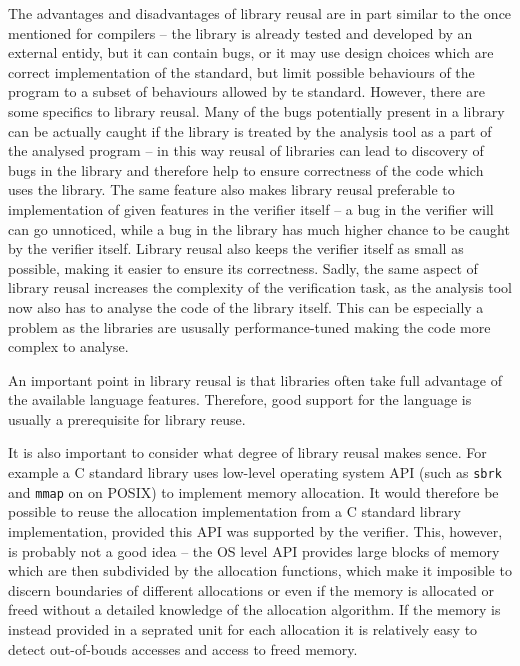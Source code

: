 The advantages and disadvantages of library reusal are in part similar to the
once mentioned for compilers -- the library is already tested and developed by
an external entidy, but it can contain bugs, or it may use design choices which
are correct implementation of the standard, but limit possible behaviours of
the program to a subset of behaviours allowed by te standard.
However, there are some specifics to library reusal.
Many of the bugs potentially present in a library can be actually caught if the
library is treated by the analysis tool as a part of the analysed program -- in
this way reusal of libraries can lead to discovery of bugs in the library and
therefore help to ensure correctness of the code which uses the
library.
The same feature also makes library reusal preferable to implementation of given features in the verifier itself -- a bug in the verifier will can go unnoticed, while a bug in the library has much higher chance to be caught by the verifier itself.
Library reusal also keeps the verifier itself as small as possible, making it easier to ensure its correctness.
Sadly, the same aspect of library reusal increases the complexity of the
verification task, as the analysis tool now also has to analyse the code of the
library itself.
This can be especially a problem as the libraries are ususally performance-tuned making the code more complex to analyse.

An important point in library reusal is that libraries often take full advantage of the available language features.
Therefore, good support for the language is usually a prerequisite for library reuse.

It is also important to consider what degree of library reusal makes sence.
For example a C standard library uses low-level operating system API (such as
\texttt{sbrk} and \texttt{mmap} on on POSIX) to implement memory allocation.
It would therefore be possible to reuse the allocation implementation from a C
standard library implementation, provided this API was supported by the
verifier.
This, however, is probably not a good idea -- the OS level API provides large
blocks of memory which are then subdivided by the allocation functions, which
make it imposible to discern boundaries of different allocations or even if the
memory is allocated or freed without a detailed knowledge of the allocation
algorithm.
If the memory is instead provided in a seprated unit for each allocation it is
relatively easy to detect out-of-bouds accesses and access to freed memory.

